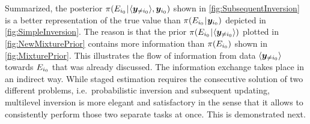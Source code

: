 \par %
Summarized, the posterior \(\pi(E_{i_0} {\:\!}|{\:\!} \langle{\bm{y}_{\neq i_0}}\rangle,\bm{y}_{i_0})\) shown in \cref{fig:SubsequentInversion}
is a better representation of the true value than \(\pi(E_{i_0} {\:\!}|{\:\!} \bm{y}_{i_0})\) depicted in \cref{fig:SimpleInversion}.
The reason is that the prior \(\pi(E_{i_0} {\:\!}|{\:\!} \langle{\bm{y}_{\neq i_0}}\rangle)\) plotted in \cref{fig:NewMixturePrior}
contains more information than \(\pi(E_{i_0})\) shown in \cref{fig:MixturePrior}.
This illustrates the flow of information from data \(\langle{\bm{y}_{\neq i_0}}\rangle\) towards \(E_{i_0}\) that was already discussed.
The information exchange takes place in an indirect way.
While staged estimation requires the consecutive solution of two different problems, i.e.\ probabilistic inversion and subsequent updating,
multilevel inversion is more elegant and satisfactory in the sense that it allows to consistently perform those two separate tasks at once.
This is demonstrated next.

